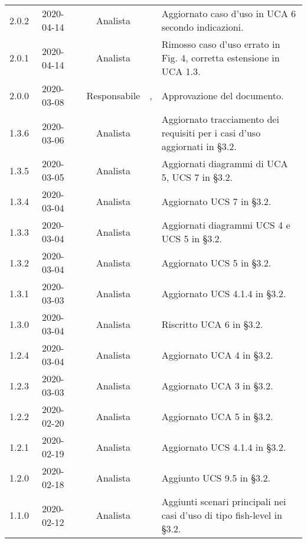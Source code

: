 {\begin{longtable}{ c c  C{2.3cm} c C{3cm} C{3.2cm}}
2.0.2 & 2020-04-14 & \DF{} & Analista & \AT{} & Aggiornato caso d'uso in UCA 6 secondo indicazioni. \\

2.0.1 & 2020-04-14 & \DF{} & Analista & \AT{} & Rimosso caso d'uso errato in Fig. 4, corretta estensione in UCA 1.3. \\

2.0.0 & 2020-03-08 & \LD{} & Responsabile & \CE{}, \PF{} & Approvazione del documento. \\

1.3.6 & 2020-03-06 & \AT{} & Analista & \DF{} & Aggiornato tracciamento dei requisiti per i casi d'uso aggiornati in §3.2. \\

1.3.5 & 2020-03-05 & \AT{} & Analista & \PF{} & Aggiornati diagrammi di UCA 5, UCS 7 in §3.2. \\

1.3.4 & 2020-03-04 & \AT{} & Analista & \PF{} & Aggiornato UCS 7 in §3.2. \\

1.3.3 & 2020-03-04 & \SE{} & Analista & \PF{} & Aggiornati diagrammi UCS 4 e UCS 5 in §3.2. \\

1.3.2 & 2020-03-04 & \SE{} & Analista & \DF{} & Aggiornato UCS 5 in §3.2. \\

1.3.1 & 2020-03-03 & \SE{} & Analista & \PF{} & Aggiornato UCS 4.1.4 in §3.2. \\

1.3.0 & 2020-03-04 & \DF{} & Analista & \CE{} & Riscritto UCA 6 in §3.2. \\

1.2.4 & 2020-03-04 & \DF{} & Analista & \CE{} & Aggiornato UCA 4 in §3.2. \\

1.2.3 & 2020-03-03 & \DF{} & Analista & \CE{} & Aggiornato UCA 3 in §3.2. \\

1.2.2 & 2020-02-20 & \AT{} & Analista & \DF{} & Aggiornato UCA 5 in §3.2. \\

1.2.1 & 2020-02-19 & \SE{} & Analista & \DF{} & Aggiornato UCS 4.1.4 in §3.2. \\

1.2.0 & 2020-02-18 & \DF{} & Analista & \CE{} & Aggiunto UCS 9.5 in §3.2. \\

1.1.0 & 2020-02-12 & \DF{} & Analista & \CE{} & Aggiunti scenari principali nei casi d'uso di tipo fish-level in §3.2. \\


\end{longtable}}

